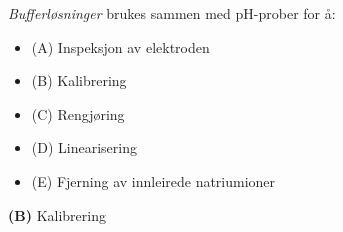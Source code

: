 

{\it Bufferløsninger} brukes sammen med pH-prober for å:

\begin{itemize}
\item{(A)} Inspeksjon av elektroden
\vskip 5pt 
\item{(B)} Kalibrering
\vskip 5pt 
\item{(C)} Rengjøring
\vskip 5pt 
\item{(D)} Linearisering
\vskip 5pt 
\item{(E)} Fjerning av innleirede natriumioner
\end{itemize}







{\bf (B)} Kalibrering
 







